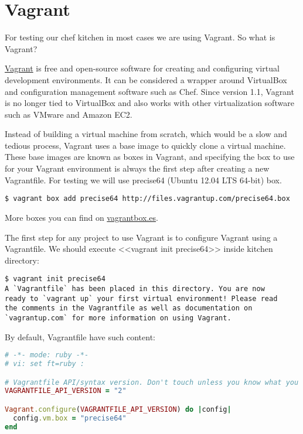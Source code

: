 \section{Vagrant}\label{sec:solo-vagrant}

For testing our chef kitchen in most cases we are using Vagrant. So what is Vagrant?

\href{http://www.vagrantup.com/}{Vagrant} is free and open-source software for creating and configuring virtual development environments. It can be considered a wrapper around VirtualBox and configuration management software such as Chef. Since version 1.1, Vagrant is no longer tied to VirtualBox and also works with other virtualization software such as VMware and Amazon EC2.

Instead of building a virtual machine from scratch, which would be a slow and tedious process, Vagrant uses a base image to quickly clone a virtual machine. These base images are known as boxes in Vagrant, and specifying the box to use for your Vagrant environment is always the first step after creating a new Vagrantfile. For testing we will use precise64 (Ubuntu 12.04 LTS 64-bit) box.

\begin{lstlisting}[label=lst:my-cloud-vagrant1]
$ vagrant box add precise64 http://files.vagrantup.com/precise64.box
\end{lstlisting}

More boxes you can find on \href{http://www.vagrantbox.es/}{vagrantbox.es}.

The first step for any project to use Vagrant is to configure Vagrant using a Vagrantfile. We should execute <<vagrant init precise64>> inside kitchen directory:

\begin{lstlisting}[label=lst:my-cloud-vagrant2]
$ vagrant init precise64
A `Vagrantfile` has been placed in this directory. You are now
ready to `vagrant up` your first virtual environment! Please read
the comments in the Vagrantfile as well as documentation on
`vagrantup.com` for more information on using Vagrant.
\end{lstlisting}

By default, Vagrantfile have such content:

\begin{lstlisting}[language=Ruby,label=lst:my-cloud-vagrant3,title=my-cloud/nodes/Vagrantfile]
# -*- mode: ruby -*-
# vi: set ft=ruby :

# Vagrantfile API/syntax version. Don't touch unless you know what you're doing!
VAGRANTFILE_API_VERSION = "2"

Vagrant.configure(VAGRANTFILE_API_VERSION) do |config|
  config.vm.box = "precise64"
end
\end{lstlisting}


